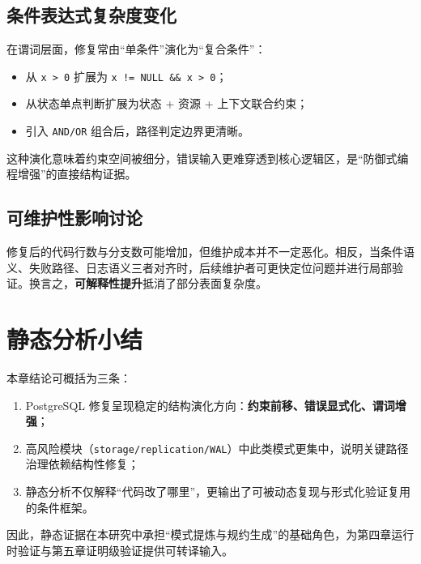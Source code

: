 \subsection*{条件表达式复杂度变化}
在谓词层面，修复常由“单条件”演化为“复合条件”：
\begin{itemize}
    \item 从 \texttt{x > 0} 扩展为 \texttt{x != NULL \&\& x > 0}；
    \item 从状态单点判断扩展为状态 + 资源 + 上下文联合约束；
    \item 引入 \texttt{AND/OR} 组合后，路径判定边界更清晰。
\end{itemize}

这种演化意味着约束空间被细分，错误输入更难穿透到核心逻辑区，是“防御式编程增强”的直接结构证据。

\subsection*{可维护性影响讨论}
修复后的代码行数与分支数可能增加，但维护成本并不一定恶化。相反，当条件语义、失败路径、日志语义三者对齐时，后续维护者可更快定位问题并进行局部验证。换言之，\textbf{可解释性提升}抵消了部分表面复杂度。

\section{静态分析小结}
本章结论可概括为三条：
\begin{enumerate}
    \item PostgreSQL 修复呈现稳定的结构演化方向：\textbf{约束前移、错误显式化、谓词增强}；
    \item 高风险模块（\texttt{storage/replication/WAL}）中此类模式更集中，说明关键路径治理依赖结构性修复；
    \item 静态分析不仅解释“代码改了哪里”，更输出了可被动态复现与形式化验证复用的条件框架。
\end{enumerate}

因此，静态证据在本研究中承担“模式提炼与规约生成”的基础角色，为第四章运行时验证与第五章证明级验证提供可转译输入。